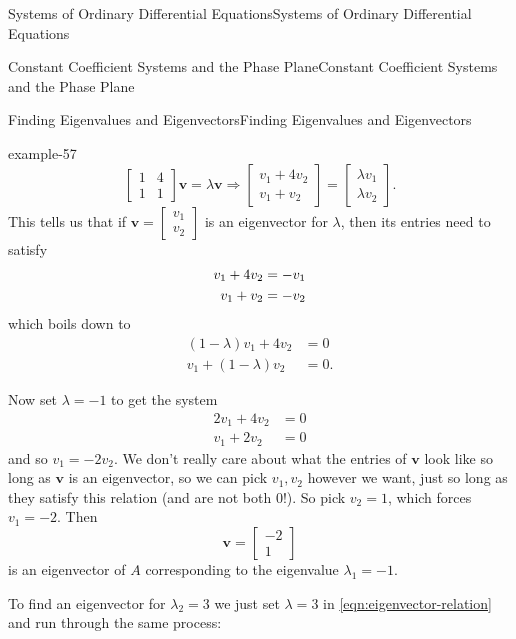\documentclass[10pt,]{book}
\numberwithin{equation}{section}
\renewcommand{\vec}[1]{\mathbf{#1}}
\newcommand{\amp}{&}
\begin{document}
\begin{chapterptx}{Systems of Ordinary Differential Equations}{}{Systems of Ordinary Differential Equations}{}{}
\begin{sectionptx}{Constant Coefficient Systems and the Phase Plane}{}{Constant Coefficient Systems and the Phase Plane}{}{}
\begin{subsectionptx}{Finding Eigenvalues and Eigenvectors}{}{Finding Eigenvalues and Eigenvectors}{}{}
\begin{example}{}{example-57}
\begin{equation*}
\begin{bmatrix}1 \amp  4 \\ 1 \amp  1\end{bmatrix}\vec{v} = \lambda\vec{v} \Rightarrow \begin{bmatrix}v_{1}+4v_{2} \\ v_{1} + v_{2}\end{bmatrix} = \begin{bmatrix} \lambda v_{1} \\ \lambda v_{2} \end{bmatrix}.
\end{equation*}
This tells us that if \(\vec{v} = \begin{bmatrix}v_{1} \\ v_{2} \end{bmatrix}\) is an eigenvector for \(\lambda\), then its entries need to satisfy%
\begin{align}
v_{1}+4v_{2}\amp =-v_{1}\notag\\
v_{1}+v_{2} \amp = -v_{2}\notag
\end{align}
which boils down to%
\begin{align*}
(1-\lambda)v_{1}+4v_{2} \amp = 0\\
v_{1} + (1-\lambda)v_{2} \amp = 0.
\end{align*}
%
\par
\hypertarget{p-341}{}%
Now set \(\lambda = -1\) to get the system%
\begin{align*}
2v_{1} + 4v_{2} \amp = 0\\
v_{1} + 2v_{2} \amp = 0
\end{align*}
and so \(v_{1} = -2v_{2}\). We don't really care about what the entries of \(\vec{v}\) look like so long as \(\vec{v}\) is an eigenvector, so we can pick \(v_{1},v_{2}\) however we want, just so long as they satisfy this relation (and are not both \(0\)!). So pick \(v_{2} = 1\), which forces \(v_{1} = -2\). Then%
\begin{equation*}
\vec{v} = \begin{bmatrix}-2\\1\end{bmatrix}
\end{equation*}
is an eigenvector of \(A\) corresponding to the eigenvalue \(\lambda_{1} = -1\).%
\par
\hypertarget{p-342}{}%
To find an eigenvector for \(\lambda_{2} = 3\) we just set \(\lambda  = 3\) in \ref{eqn:eigenvector-relation} and run through the same process:%

\end{example}
\end{subsectionptx}
\end{sectionptx}
\end{chapterptx}
\end{document}
